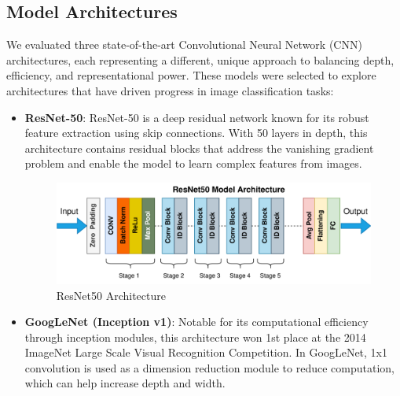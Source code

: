 \documentclass[11pt,twocolumn]{article}
\begin{document}
\subsection{Model Architectures}
We evaluated three state-of-the-art Convolutional Neural Network (CNN) architectures, each representing a different, unique approach to balancing depth, efficiency, and representational power. These models were selected to explore architectures that have driven progress in image classification tasks:
\begin{itemize}
    \item \textbf{ResNet-50}: ResNet-50 is a deep residual network known for its robust feature extraction using skip connections. With 50 layers in depth, this architecture contains residual blocks that address the vanishing gradient problem and enable the model to learn complex features from images.
\begin{figure}[h]
    \centering
    \includegraphics[width=1\linewidth]{report_images/resnet50.png}
    \caption{ResNet50 Architecture}
    \label{fig:dataset}
\end{figure}
    \item \textbf{GoogLeNet (Inception v1)}: Notable for its computational efficiency through inception modules, this architecture won 1st place at the 2014 ImageNet Large Scale Visual Recognition Competition. In GoogLeNet, 1x1 convolution is used as a dimension reduction module to reduce computation, which can help increase depth and width. 


\end{itemize}
\end{document}
